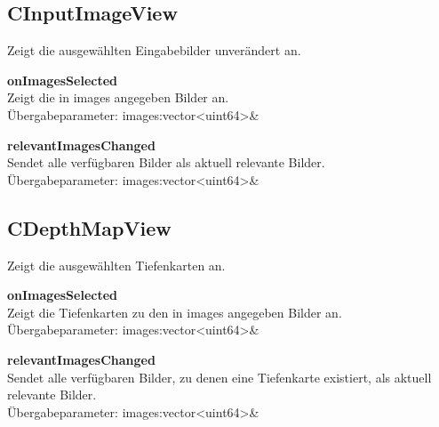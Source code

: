 \subsection{CInputImageView}
Zeigt die ausgewählten Eingabebilder unverändert an.
\beginMembers
{}
\closeMembers
\beginSlots
\item \textbf{onImagesSelected} \\Zeigt die in images angegeben Bilder an. \\Übergabeparameter: images:vector<uint64>\&
\closeMembers
\beginSignals
\item \textbf{relevantImagesChanged} \\ Sendet alle verfügbaren Bilder als aktuell relevante Bilder. \\Übergabeparameter: images:vector<uint64>\&
\closeMembers

\subsection{CDepthMapView}
Zeigt die ausgewählten Tiefenkarten an.
\beginMembers
{}
\closeMembers
\beginSlots
\item \textbf{onImagesSelected} \\Zeigt die Tiefenkarten zu den in images angegeben Bilder an. \\Übergabeparameter: images:vector<uint64>\&
\closeMembers
\beginSignals
\item \textbf{relevantImagesChanged} \\ Sendet alle verfügbaren Bilder, zu denen eine Tiefenkarte existiert, als aktuell relevante Bilder. \\Übergabeparameter: images:vector<uint64>\&
\closeMembers

